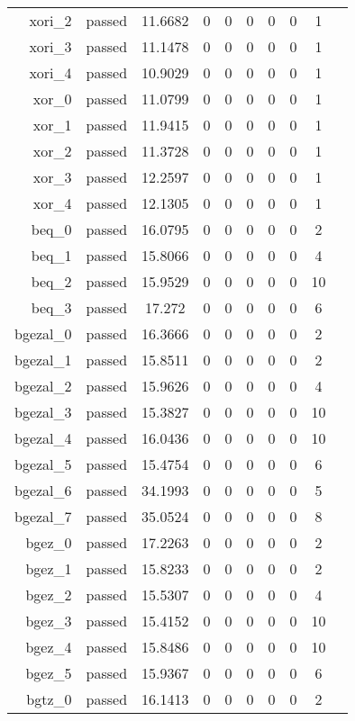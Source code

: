 \begin{longtable}{r|ccccccccc}
    xori\_2 & passed & 11.6682 & 0 & 0 & 0 & 0 & 0 & 1 \\
    xori\_3 & passed & 11.1478 & 0 & 0 & 0 & 0 & 0 & 1 \\
    xori\_4 & passed & 10.9029 & 0 & 0 & 0 & 0 & 0 & 1 \\
    xor\_0 & passed & 11.0799 & 0 & 0 & 0 & 0 & 0 & 1 \\
    xor\_1 & passed & 11.9415 & 0 & 0 & 0 & 0 & 0 & 1 \\
    xor\_2 & passed & 11.3728 & 0 & 0 & 0 & 0 & 0 & 1 \\
    xor\_3 & passed & 12.2597 & 0 & 0 & 0 & 0 & 0 & 1 \\
    xor\_4 & passed & 12.1305 & 0 & 0 & 0 & 0 & 0 & 1 \\
    beq\_0 & passed & 16.0795 & 0 & 0 & 0 & 0 & 0 & 2 \\
    beq\_1 & passed & 15.8066 & 0 & 0 & 0 & 0 & 0 & 4 \\
    beq\_2 & passed & 15.9529 & 0 & 0 & 0 & 0 & 0 & 10 \\
    beq\_3 & passed & 17.272 & 0 & 0 & 0 & 0 & 0 & 6 \\
    bgezal\_0 & passed & 16.3666 & 0 & 0 & 0 & 0 & 0 & 2 \\
    bgezal\_1 & passed & 15.8511 & 0 & 0 & 0 & 0 & 0 & 2 \\
    bgezal\_2 & passed & 15.9626 & 0 & 0 & 0 & 0 & 0 & 4 \\
    bgezal\_3 & passed & 15.3827 & 0 & 0 & 0 & 0 & 0 & 10 \\
    bgezal\_4 & passed & 16.0436 & 0 & 0 & 0 & 0 & 0 & 10 \\
    bgezal\_5 & passed & 15.4754 & 0 & 0 & 0 & 0 & 0 & 6 \\
    bgezal\_6 & passed & 34.1993 & 0 & 0 & 0 & 0 & 0 & 5 \\
    bgezal\_7 & passed & 35.0524 & 0 & 0 & 0 & 0 & 0 & 8 \\
    bgez\_0 & passed & 17.2263 & 0 & 0 & 0 & 0 & 0 & 2 \\
    bgez\_1 & passed & 15.8233 & 0 & 0 & 0 & 0 & 0 & 2 \\
    bgez\_2 & passed & 15.5307 & 0 & 0 & 0 & 0 & 0 & 4 \\
    bgez\_3 & passed & 15.4152 & 0 & 0 & 0 & 0 & 0 & 10 \\
    bgez\_4 & passed & 15.8486 & 0 & 0 & 0 & 0 & 0 & 10 \\
    bgez\_5 & passed & 15.9367 & 0 & 0 & 0 & 0 & 0 & 6 \\
    bgtz\_0 & passed & 16.1413 & 0 & 0 & 0 & 0 & 0 & 2 \\

\end{longtable}

